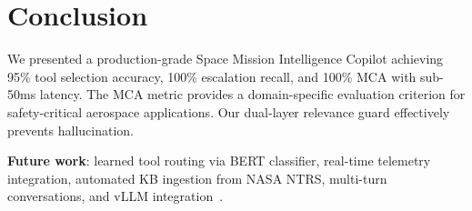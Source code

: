 \documentclass{article}
\begin{document}
\section{Conclusion}

We presented a production-grade Space Mission Intelligence Copilot achieving 95\% tool selection accuracy, 100\% escalation recall, and 100\% MCA with sub-50ms latency. The MCA metric provides a domain-specific evaluation criterion for safety-critical aerospace applications. Our dual-layer relevance guard effectively prevents hallucination.

\textbf{Future work}: learned tool routing via BERT classifier, real-time telemetry integration, automated KB ingestion from NASA NTRS, multi-turn conversations, and vLLM integration~\citep{kwon2023vllm}.



\end{document}
